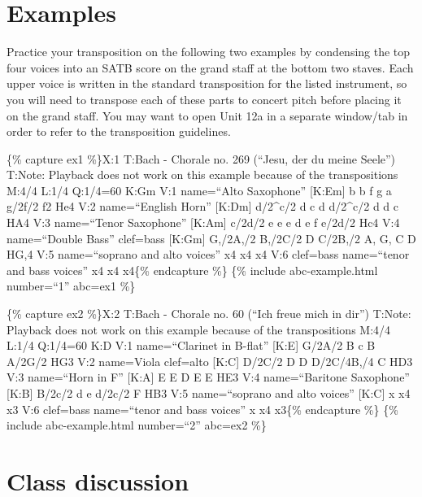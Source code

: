 \documentclass{book}
\begin{document}
\hypertarget{examples-1}{%
\chapter{Examples}\label{examples-1}}

Practice your transposition on the following two examples by condensing the
top four voices into an SATB score on the grand staff at the bottom two
staves. Each upper voice is written in the standard transposition for the
listed instrument, so you will need to transpose each of these parts to
concert pitch before placing it on the grand staff. You may want to open Unit
12a in a separate window/tab in order to refer to the transposition
guidelines.

\{\% capture ex1 \%\}X:1 T:Bach - Chorale no. 269 (``Jesu, der du meine
Seele'') T:Note: Playback does not work on this example because of the
transpositions M:4/4 L:1/4 Q:1/4=60 K:Gm V:1 name=``Alto Saxophone''
{[}K:Em{]} b b f g\textbar{} a g/2f/2 f2\textbar{} He4\textbar{]} V:2
name=``English Horn'' {[}K:Dm{]} d/2\^{}c/2 d c d\textbar{} d/2\^{}c/2 d d
c\textbar{} HA4\textbar{]} V:3 name=``Tenor Saxophone'' {[}K:Am{]} c/2d/2 e e
e\textbar{} d e f e/2d/2\textbar{} Hc4\textbar{]} V:4 name=``Double Bass''
clef=bass {[}K:Gm{]} G,/2A,/2 B,/2C/2 D C/2B,/2\textbar{} A, G, C D\textbar{}
HG,4\textbar{]} V:5 name=``soprano and alto voices'' x4\textbar{} x4\textbar{}
x4\textbar{]} V:6 clef=bass name=``tenor and bass voices'' x4\textbar{}
x4\textbar{} x4\textbar{]}\{\% endcapture \%\} \{\% include abc-example.html
number=``1'' abc=ex1 \%\}

\{\% capture ex2 \%\}X:2 T:Bach - Chorale no. 60 (``Ich freue mich in dir'')
T:Note: Playback does not work on this example because of the transpositions
M:4/4 L:1/4 Q:1/4=60 K:D V:1 name=``Clarinet in B-flat'' {[}K:E{]}
G/2A/2\textbar{} B c B A/2G/2\textbar{} HG3\textbar{]} V:2 name=Viola
clef=alto {[}K:C{]} D/2C/2\textbar{} D D D/2C/4B,/4 C\textbar{} HD3\textbar{]}
V:3 name=``Horn in F'' {[}K:A{]} E\textbar{} E D E E\textbar{} HE3\textbar{]}
V:4 name=``Baritone Saxophone'' {[}K:B{]} B/2c/2\textbar{} d e d/2c/2
F\textbar{} HB3\textbar{]} V:5 name=``soprano and alto voices'' {[}K:C{]}
x\textbar{} x4\textbar{} x3\textbar{]} V:6 clef=bass name=``tenor and bass
voices'' x\textbar{} x4\textbar{} x3\textbar{]}\{\% endcapture \%\} \{\%
include abc-example.html number=``2'' abc=ex2 \%\}

\hypertarget{class-discussion-25}{%
\chapter{Class discussion}\label{class-discussion-25}}
\end{document}
